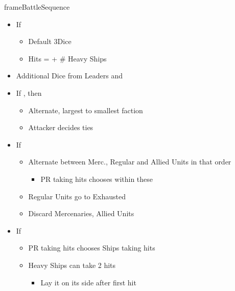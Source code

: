 \documentclass[10pt]{article}
\newlength{\fhBattleSequence} \setlength\fhBattleSequence{50\baselineskip}
\begin{document}
\begin{dynamiccontents*}{frameBattleSequence}
\begin{eubox}{\fhBattleSequence}
\begin{multicols}{2}
\begin{itemize}
\begin{itemize}
				\begin{itemize}
					\item 3\infantry/3\cavalry for Muslim PRs (p.~38)
				\end{itemize}
				\item 1 hit per matching unit
				\item By default, \tercios=\infantry
			\end{itemize}
			\item If 
			\begin{itemize}
				\item Default 3\artillery Dice
				\item Hits = \artillery + \# Heavy Ships
			\end{itemize}
			\item Additional Dice from Leaders and \battleactions
		\end{itemize}
		\begin{itemize}
			\item If , then
			\begin{itemize}
				\item Alternate, largest to smallest faction
				\item Attacker decides ties
			\end{itemize}
			\item If 
			\begin{itemize}
				\item Alternate between Merc., Regular and Allied Units in that order
				\begin{itemize}
					\item PR taking hits chooses within these
				\end{itemize}
				\item Regular Units go to Exhausted \manpower
				\item Discard Mercenaries, Allied Units
			\end{itemize}
			\item If 
			\begin{itemize}
				\item PR taking hits chooses Ships taking hits
				\item Heavy Ships can take 2 hits
				\begin{itemize}
					\item Lay it on its side after first hit
				\end{itemize}
			\end{itemize}

\end{itemize}
\end{multicols}
\end{eubox}
\end{dynamiccontents*}
\end{document}

